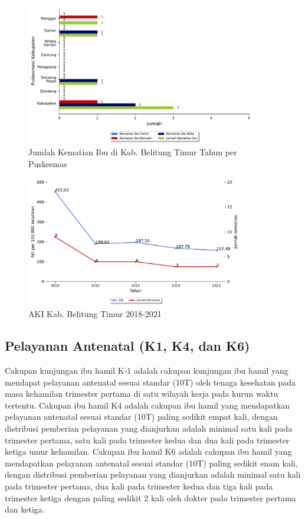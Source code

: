 \begin{figure}[H]
    \centering{}
    \includegraphics[width=0.9\textwidth]{bab_05/bab_05_01_kematianIbu}
    \caption{Jumlah Kematian Ibu di Kab. Belitung Timur Tahun \tP per Puskesmas}
    \label{fig:Jumlah-Kematian-Ibu}
\end{figure}

\begin{figure}[H]
    \centering{}
    \includegraphics[width=0.85\textwidth]{bab_05/bab_05_02_plotAKI}
    \caption{AKI Kab. Belitung Timur 2018-2021}
    \label{fig:AKI-2018-2021}
\end{figure}

\subsection{Pelayanan Antenatal (K1, K4, dan K6)}
Cakupan kunjungan ibu hamil K-1 adalah cakupan kunjungan ibu hamil yang mendapat pelayanan antenatal sesuai standar (10T) oleh tenaga kesehatan pada masa kehamilan trimester
pertama di satu wilayah kerja pada kurun waktu tertentu. Cakupan ibu hamil K4 adalah cakupan ibu hamil yang mendapatkan pelayanan antenatal sesuai standar (10T) paling sedikit empat kali, dengan distribusi pemberian pelayanan yang dianjurkan adalah minimal satu kali pada trimester pertama, satu kali pada trimester kedua dan dua kali pada trimester ketiga umur kehamilan. Cakupan ibu hamil K6 adalah cakupan ibu hamil yang mendapatkan pelayanan antenatal sesuai standar (10T) paling sedikit enam kali, dengan distribusi pemberian pelayanan yang dianjurkan adalah minimal satu kali pada trimester pertama, dua kali pada trimester kedua dan tiga kali pada trimester ketiga dengan paling sedikit 2 kali oleh dokter pada trimester pertama dan ketiga.

